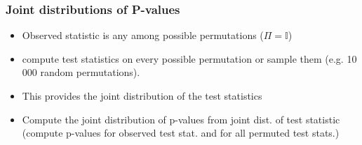 \documentclass[xcolor={pdftex,dvipsnames,table}]{beamer}
\newcommand{\bi}{\begin {itemize}}
\newcommand{\ei}{\end{itemize}}
\newcommand{\Perm}{\Pi}
\begin{document}
\begin{frame}[fragile]

\frametitle{Joint distributions of P-values }
\bi
\item Observed statistic is any among possible permutations ($\Perm=\mathbb{I}$)
\item compute test statistics on every possible permutation or sample them (e.g. 10 000 random permutations).
\pause 
\item This provides the joint distribution of the test statistics
\pause
\item Compute the joint distribution of p-values from joint dist. of test statistic\\
(compute p-values for observed test stat. and for all permuted test stats.)
\ei

\end{frame}
\end{document}
